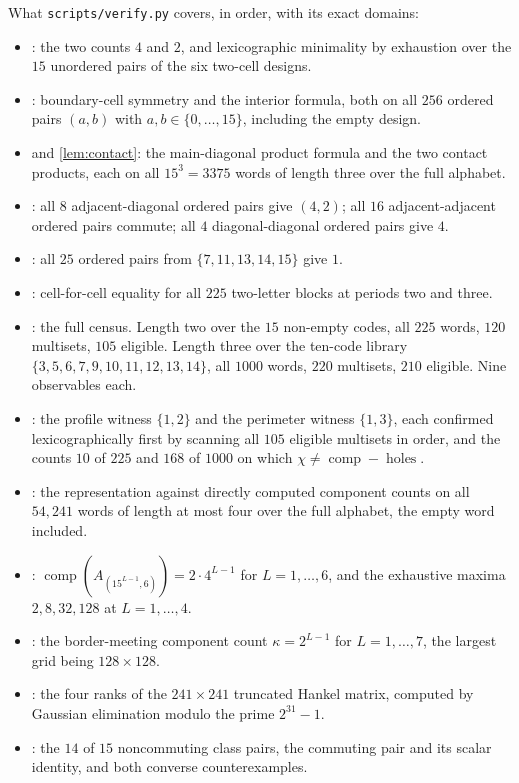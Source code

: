 \documentclass[11pt]{amsart}
\theoremstyle{definition}
\theoremstyle{remark}
\begin{document}
What \texttt{scripts/verify.py} covers, in order, with its exact domains:

\begin{itemize}
\item {}: the two counts $4$ and $2$, and lexicographic minimality by exhaustion over the $15$ unordered pairs of the six two-cell designs.
\item {}: boundary-cell symmetry and the interior formula, both on all $256$ ordered pairs $(a,b)$ with $a,b \in \{0,\dots,15\}$, including the empty design.
\item {} and \cref{lem:contact}: the main-diagonal product formula and the two contact products, each on all $15^3 = 3375$ words of length three over the full alphabet.
\item {}: all $8$ adjacent-diagonal ordered pairs give $(4,2)$; all $16$ adjacent-adjacent ordered pairs commute; all $4$ diagonal-diagonal ordered pairs give $4$.
\item {}: all $25$ ordered pairs from $\{7,11,13,14,15\}$ give $1$.
\item {}: cell-for-cell equality for all $225$ two-letter blocks at periods two and three.
\item {}: the full census. Length two over the $15$ non-empty codes, all $225$ words, $120$ multisets, $105$ eligible. Length three over the ten-code library $\{3,5,6,7,9,10,11,12,13,14\}$, all $1000$ words, $220$ multisets, $210$ eligible. Nine observables each.
\item {}: the profile witness $\{1,2\}$ and the perimeter witness $\{1,3\}$, each confirmed lexicographically first by scanning all $105$ eligible multisets in order, and the counts $10$ of $225$ and $168$ of $1000$ on which $\chi \neq \operatorname{comp} - \operatorname{holes}$.
\item {}: the representation against directly computed component counts on all $54{,}241$ words of length at most four over the full alphabet, the empty word included.
\item {}: $\operatorname{comp}(A_{(15^{L-1},6)}) = 2 \cdot 4^{L-1}$ for $L = 1,\dots,6$, and the exhaustive maxima $2, 8, 32, 128$ at $L = 1,\dots,4$.
\item {}: the border-meeting component count $\kappa = 2^{L-1}$ for $L = 1,\dots,7$, the largest grid being $128 \times 128$.
\item {}: the four ranks of the $241 \times 241$ truncated Hankel matrix, computed by Gaussian elimination modulo the prime $2^{31}-1$.
\item {}: the $14$ of $15$ noncommuting class pairs, the commuting pair and its scalar identity, and both converse counterexamples.
\end{itemize}
\end{document}
